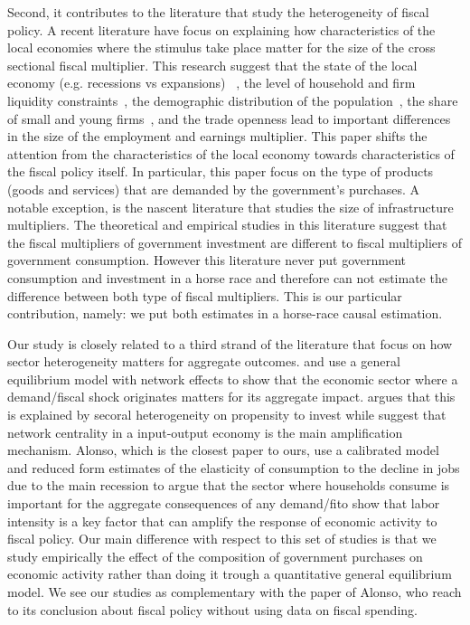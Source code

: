 \documentclass[dv_diss_main.tex]{subfiles}
\begin{document}
Second, it contributes to the literature that study the heterogeneity of fiscal policy. A recent literature have focus on explaining how characteristics of the local economies where the stimulus take place matter for the size of the cross sectional fiscal multiplier.  This research suggest that the state of the local economy (e.g. recessions vs expansions) ~\citep{cohen2011powerful, serrato2016estimating,buchheim2020job}, the level of household and firm liquidity constraints~\citep{Demyanyk2019,auerbach2020effects, bruckner2014local}, the demographic distribution of the population~\citep{basso2021young}, the share of small and young firms~\citep{Juarros2021}, and the trade openness\citep{corbi2019regional} lead to important differences in the size of the employment and earnings multiplier. This paper shifts the attention from the characteristics of the local economy towards characteristics of the fiscal policy itself. In particular, this paper focus on the type of products (goods and services) that are demanded by the government's purchases. A notable exception, is the nascent literature that studies the size of infrastructure multipliers. The theoretical \citep{Boehm2020, ramey2020macroeconomic} and empirical studies \citep{buchheim2017employment,garin2019putting} in this literature suggest that the fiscal multipliers of government investment are different to fiscal multipliers of government consumption. However this literature never put government consumption and investment in a horse race and therefore can not estimate the difference between both type of fiscal multipliers. This is our particular contribution, namely: we put both estimates in a horse-race causal estimation.

Our study is closely related to a third strand of the literature that focus on how sector heterogeneity matters for aggregate outcomes. \cite{vom2022investment} and \cite{bouakez2020government} use a general equilibrium model with network effects to show that the economic sector where a demand/fiscal shock originates matters for its aggregate impact.\cite{vom2022investment} argues that this is explained by secoral heterogeneity on propensity to invest while \cite{bouakez2020government} suggest that network centrality in a input-output economy is the main amplification mechanism. Alonso, which is the closest paper to ours, use a calibrated model and reduced form estimates of the elasticity of consumption to the decline in jobs due to the main recession to argue that the sector where households consume is important for the aggregate consequences of any demand/fito show that labor intensity is a key factor that can amplify the response of economic activity to fiscal policy. Our main difference with respect to this set of  studies is that we study empirically the effect of the composition of government purchases on economic activity rather than doing it trough a quantitative general equilibrium model. We see our studies as complementary with the paper of Alonso, who reach to its conclusion about fiscal policy without using data on fiscal spending.  
\end{document}
